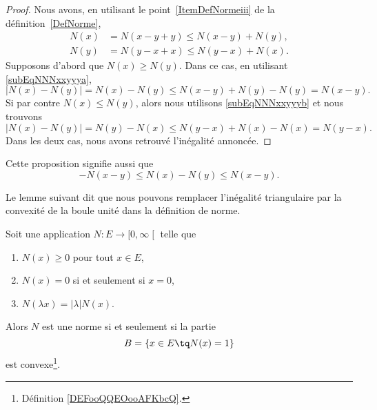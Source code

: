 \begin{proof}
	Nous avons, en utilisant le point~\ref{ItemDefNormeiii} de la définition~\ref{DefNorme},
	\begin{subequations}
		\begin{align}
			N(x)&=N(x-y+y)\leq N(x-y)+N(y),	\label{subEqNNNxxyyya}\\
			N(y)&=N(y-x+x)\leq N(y-x)+N(x).	\label{subEqNNNxxyyyb}
		\end{align}
	\end{subequations}
	Supposons d'abord que $N(x)\geq N(y)$. Dans ce cas, en utilisant \eqref{subEqNNNxxyyya},
	\begin{equation}
		\big| N(x)-N(y) \big|=N(x)-N(y)\leq N(x-y)+N(y)-N(y)=N(x-y).
	\end{equation}
	Si par contre $N(x)\leq N(y)$, alors nous utilisons \eqref{subEqNNNxxyyyb} et nous trouvons
	\begin{equation}
		\big| N(x)-N(y) \big|=N(y)-N(x)\leq N(y-x)+N(x)-N(x)=N(y-x).
	\end{equation}
	Dans les deux cas, nous avons retrouvé l'inégalité annoncée.
\end{proof}
Cette proposition signifie aussi que
\begin{equation}	\label{EqNleqNNleqNvqlqbs}
	-N(x-y)\leq N(x)-N(y)\leq N(x-y).
\end{equation}

Le lemme suivant dit que nous pouvons remplacer l'inégalité triangulaire par la convexité de la boule unité dans la définition de norme.
\begin{lemma}     \label{LEMooAVIJooFhdXXr}
    Soit une application \( N\colon E\to \mathopen[ 0 , \infty \mathclose[\) telle que
        \begin{enumerate}
            \item
                \( N(x)\geq 0\) pour tout \( x\in E\),
            \item
                \( N(x)=0\) si et seulement si \( x=0\),
            \item
                \( N(\lambda x)=| \lambda | N(x)\).
        \end{enumerate}
        Alors \( N\) est une norme si et seulement si la partie
        \begin{equation}
            B = \{ x\in E\tq N(x)=1 \}
        \end{equation}
        est convexe\footnote{Définition \ref{DEFooQQEOooAFKbcQ}.}.
\end{lemma}

